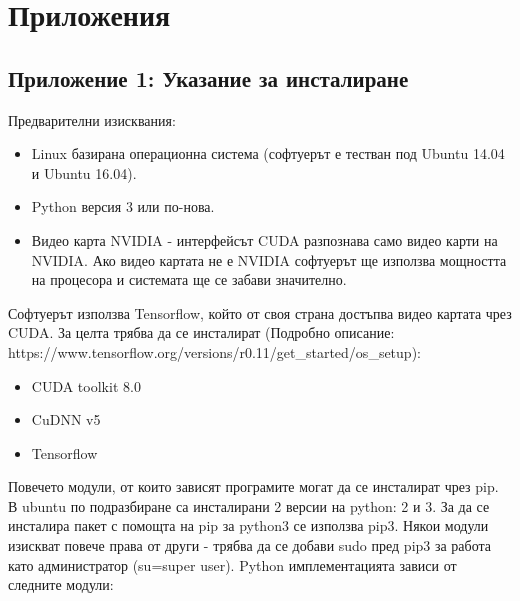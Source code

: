 \chapter{Приложения}

\label{Applications}


\section{Приложение 1: Указание за инсталиране}

Предварителни изисквания:

\begin{itemize}
\item Linux базирана операционна система (софтуерът е тестван под Ubuntu 14.04 и Ubuntu 16.04).
\item Python версия 3 или по-нова.
\item Видео карта NVIDIA - интерфейсът CUDA разпознава само видео карти на NVIDIA. Ако видео картата не е NVIDIA софтуерът ще използва мощността на процесора и системата ще се забави значително.
\end{itemize}

Софтуерът използва Tensorflow, който от своя страна достъпва видео картата чрез CUDA. За целта трябва да се инсталират (Подробно описание: https://www.tensorflow.org/versions/r0.11/get\_started/os\_setup):

\begin{itemize}
\item CUDA toolkit 8.0
\item CuDNN v5
\item Tensorflow
\end{itemize}

Повечето модули, от които зависят програмите могат да се инсталират чрез pip. В ubuntu по подразбиране са инсталирани 2 версии на python: 2 и 3. За да се инсталира пакет с помощта на pip за python3 се използва pip3. Някои модули изискват повече права от други - трябва да се добави sudo пред pip3 за работа като администратор (su=super user). Python имплементацията зависи от следните модули:

